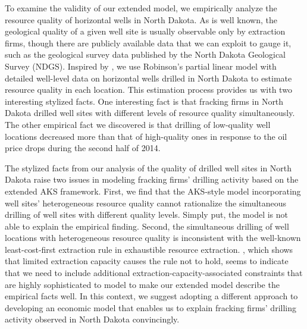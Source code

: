 To examine the validity of our extended model, we empirically analyze the resource quality of horizontal wells in North Dakota. As is well known, the geological quality of a given well site is usually observable only by extraction firms, though there are publicly available data that we can exploit to gauge it, such as the geological survey data published by the North Dakota Geological Survey (NDGS). Inspired by \cite{The-Economics-of-Time-Limited-Development-Options_2020_Herrnstadt-Kellogg-and-Lewis}, we use Robinson's partial linear model with detailed well-level data on horizontal wells drilled in North Dakota to estimate resource quality in each location. This estimation process provides us with two interesting stylized facts. One interesting fact is that fracking firms in North Dakota drilled well sites with different levels of resource quality simultaneously. The other empirical fact we discovered is that drilling of low-quality well locations decreased more than that of high-quality ones in response to the oil price drops during the second half of 2014. 

The stylized facts from our analysis of the quality of drilled well sites in North Dakota raise two issues in modeling fracking firms' drilling activity based on the extended AKS framework. First, we find that the AKS-style model incorporating well sites' heterogeneous resource quality cannot rationalize the simultaneous drilling of well sites with different quality levels. Simply put, the model is not able to explain the empirical finding. Second, the simultaneous drilling of well locations with heterogeneous resource quality is inconsistent with the well-known least-cost-first extraction rule in exhaustible resource extraction. \cite{Extraction-Capacity-and-the-Optimal-Order-of-Extraction_Holland_2003}, which shows that limited extraction capacity causes the rule not to hold, seems to indicate that we need to include additional extraction-capacity-associated constraints that are highly sophisticated to model to make our extended model describe the empirical facts well. In this context, we suggest adopting a different approach to developing an economic model that enables us to explain fracking firms' drilling activity observed in North Dakota convincingly. 

